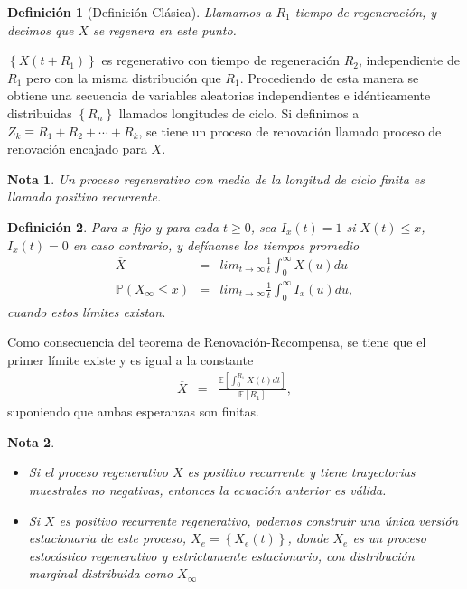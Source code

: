 \documentclass{article}
\newtheorem{Def}{Definición}[section]
\newtheorem{Note}{Nota}[section]
\newcommand{\esp}{\mathbb{E}}
\newcommand{\prob}{\mathbb{P}}
\numberwithin{equation}{section}
\begin{document}
{\begin{Def}[Definici\'on Cl\'asica]
Llamamos a $R_{1}$ tiempo de regeneraci\'on, y decimos que $X$ se regenera en este punto.
\end{Def}

$\left\{X\left(t+R_{1}\right)\right\}$ es regenerativo con tiempo de regeneraci\'on $R_{2}$, independiente de $R_{1}$ pero con la misma distribuci\'on que $R_{1}$. Procediendo de esta manera se obtiene una secuencia de variables aleatorias independientes e id\'enticamente distribuidas $\left\{R_{n}\right\}$ llamados longitudes de ciclo. Si definimos a $Z_{k}\equiv R_{1}+R_{2}+\cdots+R_{k}$, se tiene un proceso de renovaci\'on llamado proceso de renovaci\'on encajado para $X$.

\begin{Note}
Un proceso regenerativo con media de la longitud de ciclo finita es llamado positivo recurrente.
\end{Note}


\begin{Def}
Para $x$ fijo y para cada $t\geq0$, sea $I_{x}\left(t\right)=1$ si $X\left(t\right)\leq x$,  $I_{x}\left(t\right)=0$ en caso contrario, y def\'inanse los tiempos promedio
\begin{eqnarray*}
\overline{X}&=&lim_{t\rightarrow\infty}\frac{1}{t}\int_{0}^{\infty}X\left(u\right)du\\
\prob\left(X_{\infty}\leq x\right)&=&lim_{t\rightarrow\infty}\frac{1}{t}\int_{0}^{\infty}I_{x}\left(u\right)du,
\end{eqnarray*}
cuando estos l\'imites existan.
\end{Def}

Como consecuencia del teorema de Renovaci\'on-Recompensa, se tiene que el primer l\'imite  existe y es igual a la constante
\begin{eqnarray*}
\overline{X}&=&\frac{\esp\left[\int_{0}^{R_{1}}X\left(t\right)dt\right]}{\esp\left[R_{1}\right]},
\end{eqnarray*}
suponiendo que ambas esperanzas son finitas.

\begin{Note}
\begin{itemize}
\item[a)] Si el proceso regenerativo $X$ es positivo recurrente y tiene trayectorias muestrales no negativas, entonces la ecuaci\'on anterior es v\'alida.
\item[b)] Si $X$ es positivo recurrente regenerativo, podemos construir una \'unica versi\'on estacionaria de este proceso, $X_{e}=\left\{X_{e}\left(t\right)\right\}$, donde $X_{e}$ es un proceso estoc\'astico regenerativo y estrictamente estacionario, con distribuci\'on marginal distribuida como $X_{\infty}$
\end{itemize}
\end{Note}

}
\end{document}

